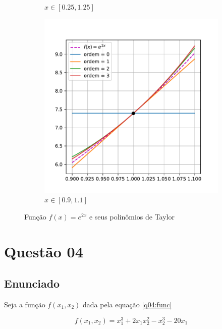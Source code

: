 \documentclass[10pt, a4paper]{article}
\begin{document}
\begin{figure}
\begin{subfigure}[b]{0.32\textwidth}
        \caption{$x \in [0.25, 1.25]$}
        \label{fig:q3_2}
    \end{subfigure}
    \hfill
    \begin{subfigure}[b]{0.32\textwidth}
        \centering
        \includegraphics[width=\textwidth]{images/q3_3.pdf}
        \caption{$x \in [0.9, 1.1]$}
        \label{fig:q3_3}
    \end{subfigure}
       \caption{Função $f(x) = e^{2x}$ e seus polinômios de Taylor}
       \label{fig:q3}
\end{figure}

\newpage

\section{Questão 04}

\subsection{Enunciado}

Seja a função $f(x_1, x_2)$ dada pela equação \cref{q04:func}

\begin{equation}\label{q04:func}
    f(x_1, x_2) = x_1^3 + 2x_1 x_2^2 - x_2^3 - 20x_1
\end{equation}
\end{document}
